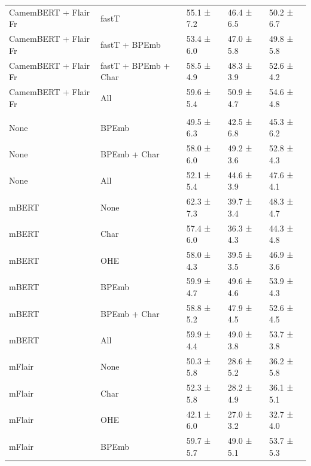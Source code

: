 \documentclass[12pt,a4paper,]{book}
\begin{document}
\begin{longtable}[t]{lllll}
\hspace{1em}CamemBERT + Flair Fr & fastT & 55.1 ±  7.2 & 46.4 ±  6.5 & 50.2 ±  6.7\\
\hspace{1em}CamemBERT + Flair Fr & fastT + BPEmb & 53.4 ±  6.0 & 47.0 ±  5.8 & 49.8 ±  5.8\\
\hspace{1em}CamemBERT + Flair Fr & fastT + BPEmb + Char & 58.5 ±  4.9 & 48.3 ±  3.9 & 52.6 ±  4.2\\
\hspace{1em}CamemBERT + Flair Fr & All & 59.6 ±  5.4 & 50.9 ±  4.7 & 54.6 ±  4.8\\
\addlinespace[0.3em]
\multicolumn{5}{l}{\textbf{Multilingual embeddings}}\\
\hspace{1em}None & BPEmb & 49.5 ±  6.3 & 42.5 ±  6.8 & 45.3 ±  6.2\\
\hspace{1em}None & BPEmb + Char & 58.0 ±  6.0 & 49.2 ±  3.6 & 52.8 ±  4.3\\
\hspace{1em}None & All & 52.1 ±  5.4 & 44.6 ±  3.9 & 47.6 ±  4.1\\
\hspace{1em}mBERT & None & 62.3 ±  7.3 & 39.7 ±  3.4 & 48.3 ±  4.7\\
\hspace{1em}mBERT & Char & 57.4 ±  6.0 & 36.3 ±  4.3 & 44.3 ±  4.8\\
\hspace{1em}mBERT & OHE & 58.0 ±  4.3 & 39.5 ±  3.5 & 46.9 ±  3.6\\
\hspace{1em}mBERT & BPEmb & 59.9 ±  4.7 & 49.6 ±  4.6 & 53.9 ±  4.3\\
\hspace{1em}mBERT & BPEmb + Char & 58.8 ±  5.2 & 47.9 ±  4.5 & 52.6 ±  4.5\\
\hspace{1em}mBERT & All & 59.9 ±  4.4 & 49.0 ±  3.8 & 53.7 ±  3.8\\
\hspace{1em}mFlair & None & 50.3 ±  5.8 & 28.6 ±  5.2 & 36.2 ±  5.8\\
\hspace{1em}mFlair & Char & 52.3 ±  5.8 & 28.2 ±  4.9 & 36.1 ±  5.1\\
\hspace{1em}mFlair & OHE & 42.1 ±  6.0 & 27.0 ±  3.2 & 32.7 ±  4.0\\
\hspace{1em}mFlair & BPEmb & 59.7 ±  5.7 & 49.0 ±  5.1 & 53.7 ±  5.3\\

\end{longtable}
\end{document}
